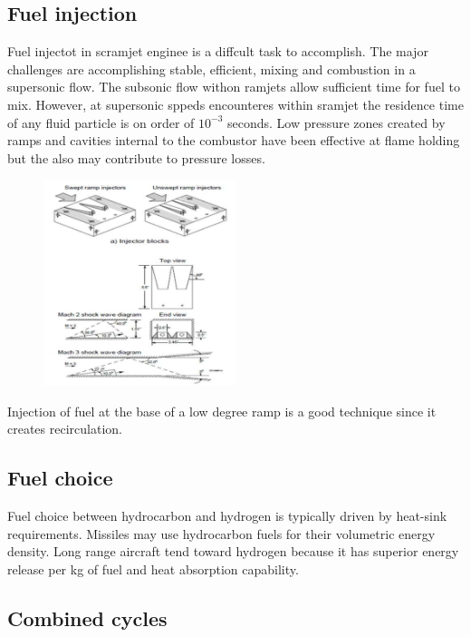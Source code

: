 \documentclass[12pt]{article}
\begin{document}
\subsection{Fuel injection}

Fuel injectot in scramjet enginee is a diffcult task to accomplish. The major challenges are accomplishing stable, efficient, mixing and combustion in a supersonic flow. The subsonic flow withon ramjets allow sufficient time for fuel to mix. However, at supersonic sppeds encounteres within sramjet the residence time of any fluid particle is on order of $10^{-3}$ seconds. Low pressure zones created by ramps and cavities internal to the combustor have been effective at flame holding but the also may contribute to pressure losses.

\begin{figure}[!ht]
\centering
\includegraphics[width=0.5\textwidth]{figures/injescram.png}
\end{figure}

Injection of fuel at the base of a low degree ramp is a good technique since it creates recirculation.

\subsection{Fuel choice}

Fuel choice between hydrocarbon and hydrogen is typically driven by heat-sink requirements. Missiles may use hydrocarbon fuels for their volumetric energy density. Long range aircraft tend toward hydrogen because it has superior energy release per kg of fuel and heat absorption capability.

\subsection{Combined cycles}
\end{document}
